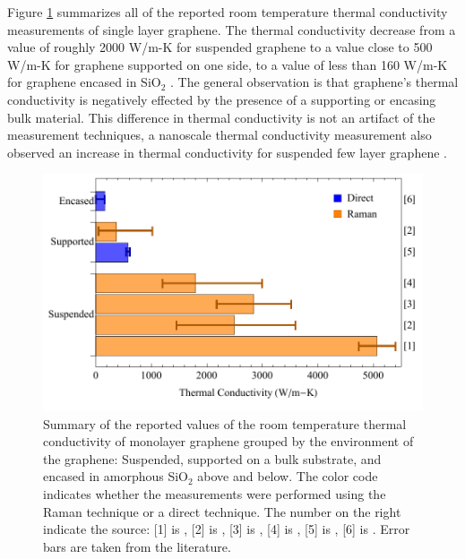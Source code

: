 Figure \ref{fig:therm:lit} summarizes all of the reported room temperature thermal conductivity measurements of single layer graphene.
The thermal conductivity decrease from a value of roughly 2000 W/m-K for suspended graphene to a value close to 500 W/m-K for graphene supported on one side, to a value of less than 160 W/m-K for graphene encased in SiO$_2$ \cite{Jang2010}.
The general observation is that graphene's thermal conductivity is negatively effected by the presence of a supporting or encasing bulk material.
This difference in thermal conductivity is not an artifact of the measurement techniques, a nanoscale thermal conductivity measurement also observed an increase in thermal conductivity for suspended few layer graphene \cite{Pumarol2012}.

\begin{figure}
	\begin{center}
	\includegraphics{Figs_Thermal/Thermal_lit.pdf}
	\end{center}
	\caption[Summary of the reported values of the room temperature thermal conductivity of monolayer graphene]{
	\label{fig:therm:lit}
		Summary of the reported values of the room temperature thermal conductivity of monolayer graphene grouped by the environment of the graphene: Suspended, supported on a bulk substrate, and encased in amorphous SiO$_2$ above and below.
		The color code indicates whether the measurements were performed using the Raman technique or a direct technique.
		The number on the right indicate the source: [1] is \cite{Balandin2008}, [2] is \cite{Cai2010}, [3] is \cite{Chen2011a}, [4] is \cite{Lee2011}, [5] is \cite{Seol2010}, [6] is \cite{Jang2010}.
		Error bars are taken from the literature.
	}
\end{figure}

